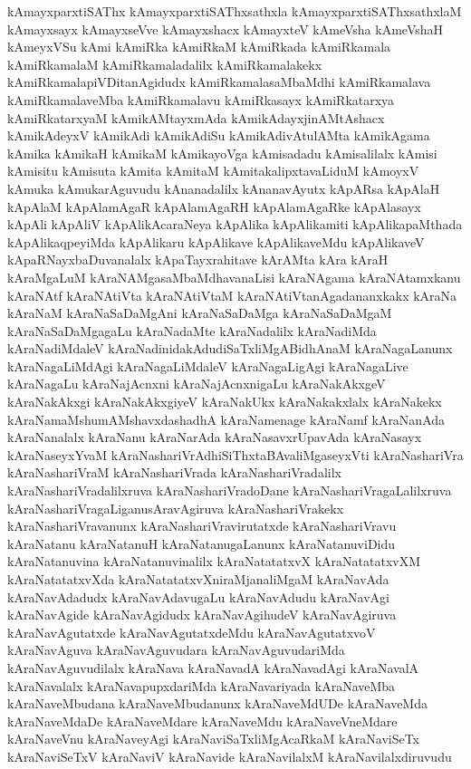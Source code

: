 {kAmayxparxtiSAThx
kAmayxparxtiSAThxsathxla
kAmayxparxtiSAThxsathxlaM
kAmayxsayx
kAmayxseVve
kAmayxshacx
kAmayxteV
kAmeVsha
kAmeVshaH
kAmeyxVSu
kAmi
kAmiRka
kAmiRkaM
kAmiRkada
kAmiRkamala
kAmiRkamalaM
kAmiRkamaladalilx
kAmiRkamalakekx
kAmiRkamalapiVDitanAgidudx
kAmiRkamalasaMbaMdhi
kAmiRkamalava
kAmiRkamalaveMba
kAmiRkamalavu
kAmiRkasayx
kAmiRkatarxya
kAmiRkatarxyaM
kAmikAMtayxmAda
kAmikAdayxjinAMtAshacx
kAmikAdeyxV
kAmikAdi
kAmikAdiSu
kAmikAdivAtulAMta
kAmikAgama
kAmika
kAmikaH
kAmikaM
kAmikayoVga
kAmisadadu
kAmisalilalx
kAmisi
kAmisitu
kAmisuta
kAmita
kAmitaM
kAmitakalipxtavaLiduM
kAmoyxV
kAmuka
kAmukarAguvudu
kAnanadalilx
kAnanavAyutx
kApARsa
kApAlaH
kApAlaM
kApAlamAgaR
kApAlamAgaRH
kApAlamAgaRke
kApAlasayx
kApAli
kApAliV
kApAlikAcaraNeya
kApAlika
kApAlikamiti
kApAlikapaMthada
kApAlikaqpeyiMda
kApAlikaru
kApAlikave
kApAlikaveMdu
kApAlikaveV
kApaRNayxbaDuvanalalx
kApaTayxrahitave
kArAMta
kAra
kAraH
kAraMgaLuM
kAraNAMgasaMbaMdhavanaLisi
kAraNAgama
kAraNAtamxkanu
kAraNAtf
kAraNAtiVta
kAraNAtiVtaM
kAraNAtiVtanAgadananxkakx
kAraNa
kAraNaM
kAraNaSaDaMgAni
kAraNaSaDaMga
kAraNaSaDaMgaM
kAraNaSaDaMgagaLu
kAraNadaMte
kAraNadalilx
kAraNadiMda
kAraNadiMdaleV
kAraNadinidakAdudiSaTxliMgABidhAnaM
kAraNagaLanunx
kAraNagaLiMdAgi
kAraNagaLiMdaleV
kAraNagaLigAgi
kAraNagaLive
kAraNagaLu
kAraNajAcnxni
kAraNajAcnxnigaLu
kAraNakAkxgeV
kAraNakAkxgi
kAraNakAkxgiyeV
kAraNakUkx
kAraNakakxlalx
kAraNakekx
kAraNamaMshumAMshavxdashadhA
kAraNamenage
kAraNamf
kAraNanAda
kAraNanalalx
kAraNanu
kAraNarAda
kAraNasavxrUpavAda
kAraNasayx
kAraNaseyxYvaM
kAraNashariVrAdhiSiThxtaBAvaliMgaseyxVti
kAraNashariVra
kAraNashariVraM
kAraNashariVrada
kAraNashariVradalilx
kAraNashariVradalilxruva
kAraNashariVradoDane
kAraNashariVragaLalilxruva
kAraNashariVragaLiganusAravAgiruva
kAraNashariVrakekx
kAraNashariVravanunx
kAraNashariVravirutatxde
kAraNashariVravu
kAraNatanu
kAraNatanuH
kAraNatanugaLanunx
kAraNatanuviDidu
kAraNatanuvina
kAraNatanuvinalilx
kAraNatatatxvX
kAraNatatatxvXM
kAraNatatatxvXda
kAraNatatatxvXniraMjanaliMgaM
kAraNavAda
kAraNavAdadudx
kAraNavAdavugaLu
kAraNavAdudu
kAraNavAgi
kAraNavAgide
kAraNavAgidudx
kAraNavAgihudeV
kAraNavAgiruva
kAraNavAgutatxde
kAraNavAgutatxdeMdu
kAraNavAgutatxvoV
kAraNavAguva
kAraNavAguvudara
kAraNavAguvudariMda
kAraNavAguvudilalx
kAraNava
kAraNavadA
kAraNavadAgi
kAraNavalA
kAraNavalalx
kAraNavapupxdariMda
kAraNavariyada
kAraNaveMba
kAraNaveMbudana
kAraNaveMbudanunx
kAraNaveMdUDe
kAraNaveMda
kAraNaveMdaDe
kAraNaveMdare
kAraNaveMdu
kAraNaveVneMdare
kAraNaveVnu
kAraNaveyAgi
kAraNaviSaTxliMgAcaRkaM
kAraNaviSeTx
kAraNaviSeTxV
kAraNaviV
kAraNavide
kAraNavilalxM
kAraNavilalxdiruvudu
}
